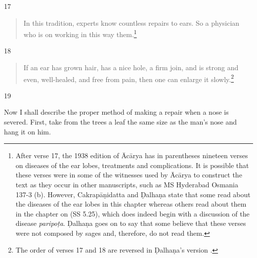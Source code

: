 \begin{translation}
    \item[17]
          \begin{verse}
    In this tradition, experts know countless repairs to ears.  So a 
    physician who is  on working in this way 
     them.\footnote{After verse 17, the 1938 edition of Ācārya \citep[80]{vulgate} has in parentheses nineteen verses on diseases of the ear lobes, treatments and complications. It is possible that these verses were in some of the witnesses used by Ācārya to construct the text as they occur in other manuscripts, such as  MS Hyderabad Osmania 137-3 (b). However, Cakrapāṇidatta \citep[132]{acar-1939} and Ḍalhaṇa \citep[80]{vulgate} state that some read about the diseases of the ear lobes in this chapter whereas others read about them in the chapter on  (SS 5.25), which does indeed begin with a discussion of the disease \emph{paripoṭa}.  Ḍalhaṇa goes on to say that some believe that these verses were not composed by sages and, therefore, do not read them.}
        \end{verse}
    
    \item[18]
           \begin{verse}
    If an ear has grown hair, has a nice hole, a firm join, and is strong and
    even, well-healed, and free from pain, then one can enlarge it slowly.\footnote{The order of verses 17 and 18 are reversed in Ḍalhaṇa's version \citep[80]{vulgate}.}
        \end{verse}
    
    \item[19]
    
    Now I shall describe the proper method of making a repair when a nose is severed.
    First, take from the trees a leaf the same size as the man's nose and hang it
    on him. 
    

\end{translation}
